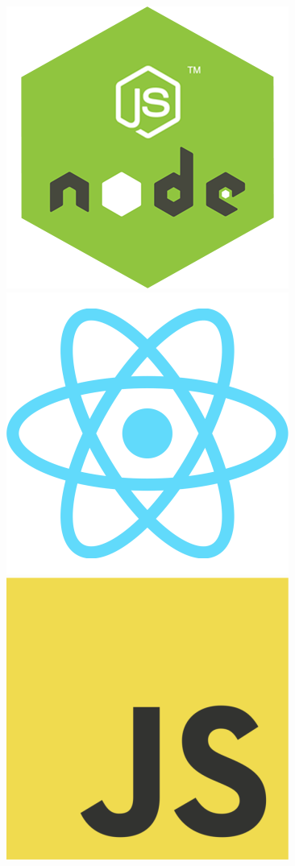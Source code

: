 \begin{figure}[htbp]
\begin{animateinline}{1}
    \newframe
    \includegraphics[scale=0.2]{./files/img/Codificacao/Animacao/NodeJS.png}     %
    \includegraphics[scale=0.2]{./files/img/Codificacao/Animacao/React.png}      %
    \includegraphics[scale=0.2]{./files/img/Codificacao/Animacao/JavaScript.png} %

\end{animateinline}
\end{figure}
